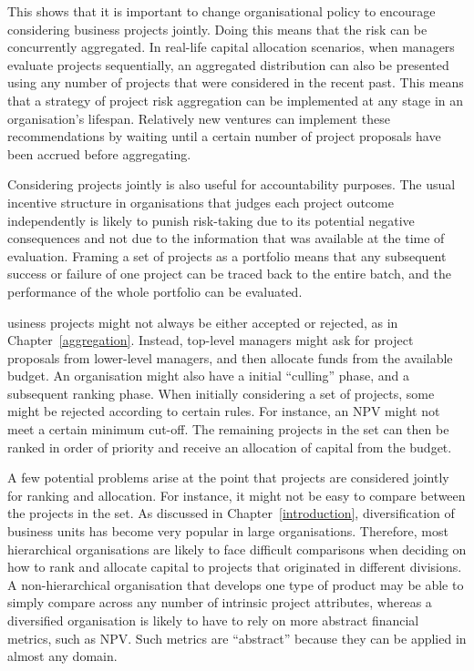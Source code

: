\documentclass[a4paper, nobind, dvipsnames]{templates/ociamthesis}
\theoremstyle{definition}
\theoremstyle{definition}
\theoremstyle{definition}
\theoremstyle{definition}
\theoremstyle{remark}
\begin{document}
This shows that it is important to change organisational policy to encourage
considering business projects jointly. Doing this means that the risk can be
concurrently aggregated. In real-life capital allocation scenarios, when
managers evaluate projects sequentially, an aggregated distribution can also be
presented using any number of projects that were considered in the recent past.
This means that a strategy of project risk aggregation can be implemented at any
stage in an organisation's lifespan. Relatively new ventures can implement these
recommendations by waiting until a certain number of project proposals have been
accrued before aggregating.

Considering projects jointly is also useful for accountability purposes. The
usual incentive structure in organisations that judges each project outcome
independently is likely to punish risk-taking due to its potential negative
consequences and not due to the information that was available at the time of
evaluation. Framing a set of projects as a portfolio means that any subsequent
success or failure of one project can be traced back to the entire batch, and
the performance of the whole portfolio can be evaluated.

usiness projects might not always be either accepted or rejected, as in
Chapter~\ref{aggregation}. Instead, top-level managers might ask for project
proposals from lower-level managers, and then allocate funds from the available
budget. An organisation might also have a initial ``culling'' phase, and a
subsequent ranking phase. When initially considering a set of projects, some
might be rejected according to certain rules. For instance, an NPV might not
meet a certain minimum cut-off. The remaining projects in the set can then be
ranked in order of priority and receive an allocation of capital from the
budget.

A few potential problems arise at the point that projects are considered jointly
for ranking and allocation. For instance, it might not be easy to compare
between the projects in the set. As discussed in Chapter~\ref{introduction},
diversification of business units has become very popular in large
organisations. Therefore, most hierarchical organisations are likely to face
difficult comparisons when deciding on how to rank and allocate capital to
projects that originated in different divisions. A non-hierarchical organisation
that develops one type of product may be able to simply compare across any
number of intrinsic project attributes, whereas a diversified organisation is
likely to have to rely on more abstract financial metrics, such as NPV. Such
metrics are ``abstract'' because they can be applied in almost any domain.
\end{document}
